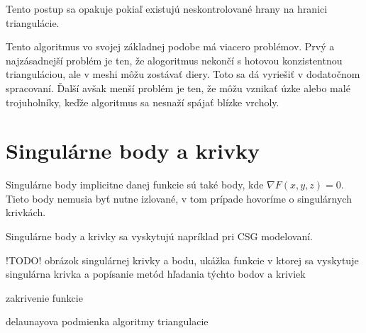 Tento postup sa opakuje pokiaľ existujú neskontrolované hrany na hranici triangulácie.

Tento algoritmus vo svojej základnej podobe má viacero problémov. Prvý a najzásadnejší problém je ten,
že alogoritmus nekončí s hotovou konzistentnou trianguláciou, ale v meshi môžu zostávať diery. Toto sa
dá vyriešiť v dodatočnom spracovaní. Ďalší avšak menší problém je ten, že môžu vznikať úzke alebo 
malé trojuholníky, keďže algoritmus sa nesnaží spájať blízke vrcholy.

\newpage

\section{Singulárne body a krivky}

Singulárne body implicitne danej funkcie sú také body, kde $\nabla F(x, y, z) = 0$. Tieto body nemusia byť nutne izlované, 
v tom prípade hovoríme o singulárnych krivkách. 

Singulárne body a krivky sa vyskytujú napríklad pri CSG modelovaní.

\medskip

!TODO! obrázok singulárnej krivky a bodu, ukážka funkcie v ktorej sa vyskytuje singulárna 
krivka a popísanie metód hľadania týchto bodov a kriviek

\medskip

zakrivenie funkcie



delaunayova podmienka
algoritmy triangulacie






